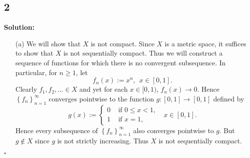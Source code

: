 \documentclass[12pt]{article}
\newcounter{ProofCounter}
\newenvironment{Solution}{\stepcounter{ProofCounter}\textbf{Solution:}}{\hfill$\square$}
\begin{document}
\subsection*{2}
\begin{Solution}
  \begin{enumerate}
    \item[(a)] We will show that $X$ is not compact. Since $X$ is a metric space, it suffices to show that $X$ is not sequentially compact. Thus we will construct a
      sequence of functions for which there is no convergent subsequence. In particular, for $n \geq 1$, let 
      \[
        f_n(x) := x^n, \ \ x \in [0,1].
      \]
      Clearly $f_1, f_2, \dots \in X$ and yet for each $x \in [0,1)$, $f_n(x) \rightarrow 0$. Hence $\left\{ f_n \right\}_{n=1}^{\infty}$ converges
      pointwise to the function $g : [0,1] \rightarrow [0,1]$ defined by
      \[
        g(x) := \left\{ \begin{array}{cl}
            0 & \text{ if } 0 \leq x < 1, \\
            1 & \text{ if } x = 1,
          \end{array}
        \right. \ \ \ x \in [0,1].
      \]
      Hence every subsequence of $\left\{ f_n \right\}_{n=1}^{\infty}$ also converges pointwise to $g$. But $g \notin X$ since $g$ is not strictly
      increasing. Thus $X$ is not
      sequentially compact.


\end{enumerate}
\end{Solution}
\end{document}
